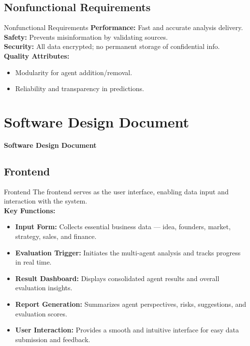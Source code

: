\documentclass{beamer}
\begin{document}
\subsection{Nonfunctional Requirements}
\begin{frame}{Nonfunctional Requirements}
    \textbf{Performance:} Fast and accurate analysis delivery.\\[6pt]
    \textbf{Safety:} Prevents misinformation by validating sources.\\[6pt]
    \textbf{Security:} All data encrypted; no permanent storage of confidential info.\\[6pt]
    \textbf{Quality Attributes:}
    \begin{itemize}
        \item Modularity for agent addition/removal.
        \item Reliability and transparency in predictions.
    \end{itemize}
\end{frame}

\section{Software Design Document}
\begin{frame}
\begin{center}
    \huge \textbf{Software Design Document}
\end{center}
\end{frame}



\subsection{Frontend}
\begin{frame}{Frontend}
    The frontend serves as the user interface, enabling data input and interaction with the system.\\[8pt]
    \textbf{Key Functions:}
    \begin{itemize}
        \item \textbf{Input Form:} Collects essential business data — idea, founders, market, strategy, sales, and finance.
        \item \textbf{Evaluation Trigger:} Initiates the multi-agent analysis and tracks progress in real time.
        \item \textbf{Result Dashboard:} Displays consolidated agent results and overall evaluation insights.
        \item \textbf{Report Generation:} Summarizes agent perspectives, risks, suggestions, and evaluation scores.
        \item \textbf{User Interaction:} Provides a smooth and intuitive interface for easy data submission and feedback.
    \end{itemize}
\end{frame}
\end{document}
